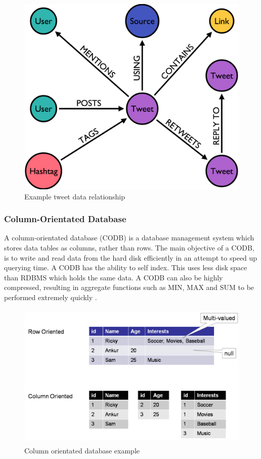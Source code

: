 \begin{figure}[H]\begin{center}\includegraphics[width=0.5\linewidth]{images/graphdb_twitter}\caption{Example tweet data relationship}\label{fig:twitter}\end{center}\end{figure}

\subsubsection{Column-Orientated Database}
A column-orientated database (CODB) is a database management system which stores data tables as columns, rather than rows. The main objective of a CODB, is to write and read data from the hard disk efficiently in an attempt to speed up querying time. A CODB has the ability to self index. This uses less disk space than RDBMS which holds the same data. A CODB can also be highly compressed, resulting in aggregate functions such as MIN, MAX and SUM to be performed extremely quickly \cite{cd}.

\begin{figure}[H]\begin{center}\includegraphics[height=7cm,width=0.75\linewidth]{images/codb}\caption{Column orientated database example}\label{fig:cod}\end{center}\end{figure}

